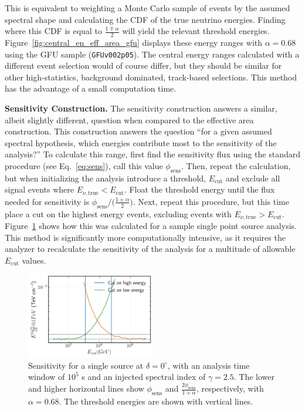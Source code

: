 \documentclass[a4paper,11pt]{article}
\begin{document}
This is equivalent to weighting a Monte Carlo sample of events by the assumed spectral shape and calculating the CDF of the true neutrino energies. Finding where this CDF is equal to $\frac{1\mp\alpha}{2}$ will yield the relevant threshold energies. Figure~\ref{fig:central_en_eff_area_gfu} displays these energy ranges with $\alpha=0.68$ using the GFU sample (\texttt{GFUv002p05}). The central energy ranges calculated with a different event selection would of course differ, but they should be similar for other high-statistics, background dominated, track-based selections. This method has the advantage of a small computation time. 

\textbf{Sensitivity Construction.} The sensitivity construction answers a similar, albeit slightly different, question when compared to the effective area construction. This construction answers the question ``for a given assumed spectral hypothesis, which energies contribute most to the sensitivity of the analysis?'' To calculate this range, first find the sensitivity flux using the standard procedure (see Eq.~\ref{eq:sens}), call this value $\phi_{\mathrm{sens}}$. Then, repeat the calculation, but when initializing the analysis introduce a threshold, $E_{\mathrm{cut}}$ and exclude all signal events where $E_{\nu, \mathrm{true}} < E_{\mathrm{cut}}$. Float the threshold energy until the flux needed for sensitivity is $\phi_{\mathrm{sens}} \big/ \big( \frac{1+\alpha}{2} \big)$. Next, repeat this procedure, but this time place a cut on the highest energy events, excluding events with $E_{\nu, \mathrm{true}} > E_{\mathrm{cut}}$. Figure~\ref{fig:central_en_sensitivity_gfu} shows how this was calculated for a sample single point source analysis. This method is significantly more computationally intensive, as it requires the analyzer to recalculate the sensitivity of the analysis for a multitude of allowable $E_{\mathrm{cut}}$ values. 

\begin{figure}
    \centering
    \includegraphics[width=0.5\textwidth]{figures/sensitivity_en_range_gfu.png}
    \caption{Sensitivity for a single source at $\delta=0^{\circ}$, with an analysis time window of $10^5$ s and an injected spectral index of $\gamma=2.5$. The lower and higher horizontal lines show $\phi_{\mathrm{sens}}$ and  $\frac{2\phi_{\mathrm{sens}}}{1+\alpha}$, respectively, with $\alpha=0.68$. The threshold energies are shown with vertical lines.}
    \label{fig:central_en_sensitivity_gfu}
\end{figure}
\end{document}

